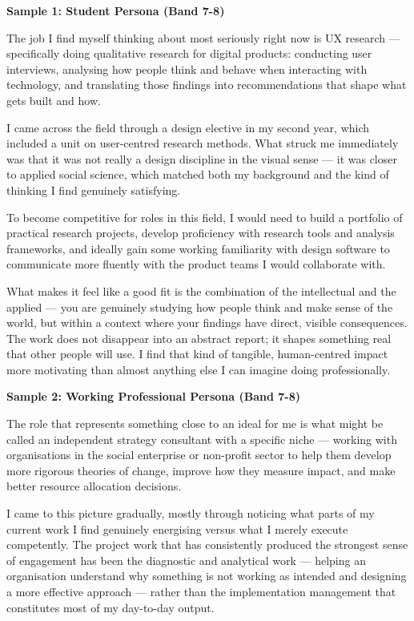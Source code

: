\begin{ieltsanswer}
\textbf{Sample 1: Student Persona (Band 7-8)}

The job I find myself thinking about most seriously right now is UX research — specifically doing qualitative research for digital products: conducting user interviews, analysing how people think and behave when interacting with technology, and translating those findings into recommendations that shape what gets built and how.

I came across the field through a design elective in my second year, which included a unit on user-centred research methods. What struck me immediately was that it was not really a design discipline in the visual sense — it was closer to applied social science, which matched both my background and the kind of thinking I find genuinely satisfying.

To become competitive for roles in this field, I would need to build a portfolio of practical research projects, develop proficiency with research tools and analysis frameworks, and ideally gain some working familiarity with design software to communicate more fluently with the product teams I would collaborate with.

What makes it feel like a good fit is the combination of the intellectual and the applied — you are genuinely studying how people think and make sense of the world, but within a context where your findings have direct, visible consequences. The work does not disappear into an abstract report; it shapes something real that other people will use. I find that kind of tangible, human-centred impact more motivating than almost anything else I can imagine doing professionally.

\textbf{Sample 2: Working Professional Persona (Band 7-8)}

The role that represents something close to an ideal for me is what might be called an independent strategy consultant with a specific niche — working with organisations in the social enterprise or non-profit sector to help them develop more rigorous theories of change, improve how they measure impact, and make better resource allocation decisions.

I came to this picture gradually, mostly through noticing what parts of my current work I find genuinely energising versus what I merely execute competently. The project work that has consistently produced the strongest sense of engagement has been the diagnostic and analytical work — helping an organisation understand why something is not working as intended and designing a more effective approach — rather than the implementation management that constitutes most of my day-to-day output.


\end{ieltsanswer}
